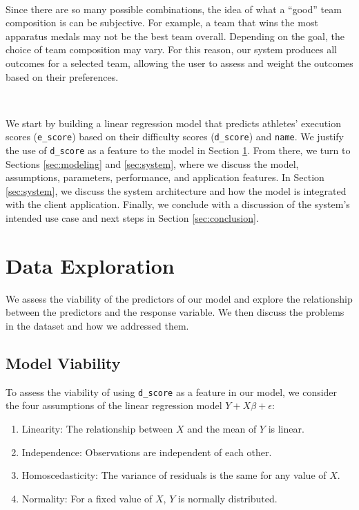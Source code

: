 \documentclass{article}
\begin{document}
\

\noindent Since there are so many possible combinations, the idea of what a 
``good'' team composition is can be subjective. For example, a team that 
wins the most apparatus medals may not be the best team overall. Depending on 
the goal, the choice of team composition may vary. For this reason, our system
produces all outcomes for a selected team, allowing the user to assess and weight 
the outcomes based on their preferences.


\

\noindent We start by building a linear regression model that predicts athletes' execution scores 
(\texttt{e\_score}) based on their difficulty scores (\texttt{d\_score}) and \texttt{name}. 
We justify the use of \texttt{d\_score} as a feature to the model 
in Section \ref{sec:eda}. From there, we turn to Sections \ref{sec:modeling} and \ref{sec:system},
where we discuss the model, assumptions, parameters, performance, and application features. In Section 
\ref{sec:system}, we discuss the system architecture and how the model is integrated with the client application. 
Finally, we conclude with a discussion of the system's intended use case and 
next steps in Section \ref{sec:conclusion}. 

\section{Data Exploration}\label{sec:eda}
We assess the viability of the predictors of our model and explore the 
relationship between the predictors and the response variable. We then 
discuss the problems in the dataset and how we addressed them.

\subsection{Model Viability}
To assess the viability of using \texttt{d\_score} as a feature in our model, we
consider the four assumptions of the linear regression model $Y + X\beta + \epsilon$:
\begin{enumerate}
    \item Linearity: The relationship between $X$ and the mean of $Y$ is linear.
    \item Independence: Observations are independent of each other.
    \item Homoscedasticity: The variance of residuals is the same for any value of $X$.
    \item Normality: For a fixed value of $X$, $Y$ is normally distributed.
\end{enumerate}
\end{document}
